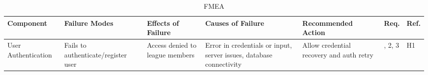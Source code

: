 \documentclass{article}
\begin{document}
\begin{landscape}
    \begin{table}[hp]
        \caption{FMEA} \label{FMEA}
        \centering
        \begin{footnotesize}
            \begin{tabular}{>{\raggedright\arraybackslash}p{1in}>{\raggedright\arraybackslash}p{1in}>{\raggedright\arraybackslash}p{1in}>{\raggedright\arraybackslash}p{1.5in}>{\raggedright\arraybackslash}p{2.5in}>{\centering\arraybackslash}p{0.2in}>{\centering\arraybackslash}p{0.2in}}
                \toprule
                \textbf{Component}        & \textbf{Failure Modes}                  & \textbf{Effects of Failure}                                                             & \textbf{Causes of Failure}                                       & \textbf{Recommended Action}                                                                                                                                                   & \textbf{Req.} & \textbf{Ref.} \\
                \midrule

                User Authentication       &
                Fails to authenticate/register user
                                          & Access denied to league members         & Error in credentials or input, server issues, database connectivity                     & Allow credential recovery and auth retry                         & 1, 2, 3                                                                                                                                                                       & H1                            \\
                \midrule


\end{tabular}
\end{footnotesize}
\end{table}
\end{landscape}
\end{document}
